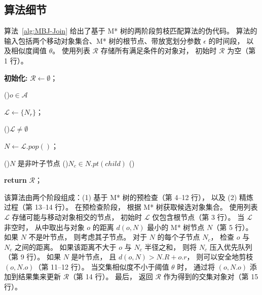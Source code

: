 \subsection{算法细节}

算法~\ref{alg:MBJ-Join} 给出了基于 M* 树的两阶段剪枝匹配算法的伪代码。 算法的输入包括两个移动对象集合、M* 树的根节点、带放宽划分参数 $\epsilon$ 的时间段， 以及相似度阈值 $\theta$。 使用列表 $\mathcal{R}$ 存储所有满足条件的对象对， 初始时 $\mathcal{R}$ 为空（第 1 行）。

\begin{algorithm}[!ht]
    \caption{$MBJ(\mathcal{A},\mathcal{B},N_r, I,\epsilon,\theta)$}
    \label{alg:MBJ-Join}

    \textbf{初始化:} $\mathcal{R} \leftarrow \emptyset$；

    \For(){$o \in \mathcal{A}$}{
        $\mathcal{L} \leftarrow \{N_r\}$；

        \While(){$\mathcal{L} \neq \emptyset$}{
            $N \leftarrow \mathcal{L}.pop()$；

            \If(){$N$ 是非叶子节点}{
                \For(){$N_c \in N.pt(child)$}{
                }
            }
            \Else(){

            }
        }
    }
    \textbf{return} $\mathcal{R}$；
    \end{algorithm}



    该算法由两个阶段组成：(1) 基于 M* 树的预检查（第 4--12 行）， 以及 (2) 精炼过程（第 13--14 行）。 在预检查阶段， 根据 M* 树获取候选对象集合。 使用列表 $\mathcal{L}$ 存储可能与移动对象相交的节点， 初始时 $\mathcal{L}$ 仅包含根节点（第 3 行）。 当 $\mathcal{L}$ 非空时， 从中取出与对象 $o$ 的距离 $d(o,N)$ 最小的 M* 树节点 $N$（第 5 行）。 如果 $N$ 不是叶节点， 则考虑其子节点。 对于 $N$ 的每个子节点 $N_c$， 检查 $o$ 与 $N_c$ 之间的距离。 如果该距离不大于 $o$ 与 $N_c$ 半径之和， 则将 $N_c$ 压入优先队列（第 9 行）。 如果 $N$ 是叶节点， 且 $d(o,N) > N.R + o.r$， 则可以安全地剪枝 $(o, N.o)$（第 11--12 行）。 当交集相似度不小于阈值 $\theta$ 时， 通过将 $(o, N.o)$ 添加到结果集来更新 $\mathcal{R}$（第 14 行）。 最后， 返回 $\mathcal{R}$ 作为得到的交集对象对（第 15 行）。

